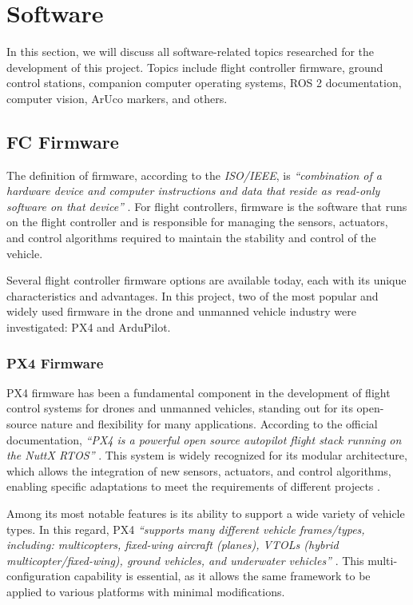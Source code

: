 
\section{Software}
In this section, we will discuss all software-related topics researched for the development of this project. Topics include flight controller firmware, ground control stations, companion computer operating systems, ROS 2 documentation, computer vision, ArUco markers, and others.

\subsection{FC Firmware}
The definition of firmware, according to the \textit{ISO/IEEE}, is \textit{“combination of a hardware device and computer instructions and data that reside as read-only software on that device”} \cite{iso_firmware}. For flight controllers, firmware is the software that runs on the flight controller and is responsible for managing the sensors, actuators, and control algorithms required to maintain the stability and control of the vehicle.

Several flight controller firmware options are available today, each with its unique characteristics and advantages. In this project, two of the most popular and widely used firmware in the drone and unmanned vehicle industry were investigated: PX4 and ArduPilot.

\subsubsection{PX4 Firmware}
PX4 firmware has been a fundamental component in the development of flight control systems for drones and unmanned vehicles, standing out for its open-source nature and flexibility for many applications. According to the official documentation, \textit{``PX4 is a powerful open source autopilot flight stack running on the NuttX RTOS''} \cite{px4_docs}. This system is widely recognized for its modular architecture, which allows the integration of new sensors, actuators, and control algorithms, enabling specific adaptations to meet the requirements of different projects \cite{px4_docs}.

Among its most notable features is its ability to support a wide variety of vehicle types. In this regard, PX4 \textit{``supports many different vehicle frames/types, including: multicopters, fixed-wing aircraft (planes), VTOLs (hybrid multicopter/fixed-wing), ground vehicles, and underwater vehicles''} \cite{px4_docs}. This multi-configuration capability is essential, as it allows the same framework to be applied to various platforms with minimal modifications.

